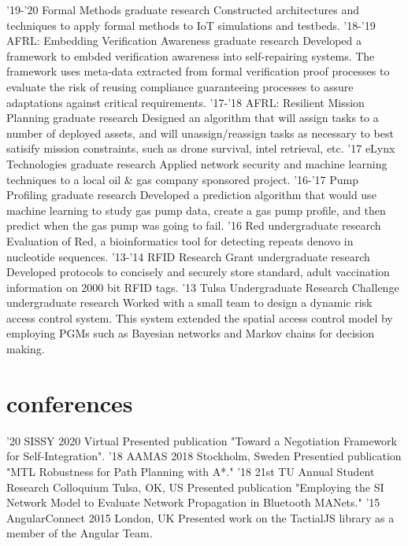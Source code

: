 \documentclass[print]{friggeri-cv}
\begin{document}
    \begin{entrylist}
      \entry
        {'19-'20}
        {Formal Methods}
        {graduate research}
        {Constructed architectures and techniques to apply formal methods to IoT simulations and testbeds.}
      \entry
        {'18-'19}
        {AFRL: Embedding Verification Awareness}
        {graduate research}
        {Developed a framework to embded verification awareness into self-repairing systems. The framework uses meta-data extracted from formal verification proof processes to evaluate the risk of reusing compliance guaranteeing processes to assure adaptations against critical requirements.}
      \entry
        {'17-'18}
        {AFRL: Resilient Mission Planning}
        {graduate research}
        {Designed an algorithm that will assign tasks to a number of deployed assets, and will unassign/reassign tasks as necessary to best satisify mission constraints, such as drone survival, intel retrieval, etc.}
      \entry
        {'17}
        {eLynx Technologies}
        {graduate research}
        {Applied network security and machine learning techniques to a local oil \& gas company sponsored project.}
      \entry
        {'16-'17}
        {Pump Profiling}
        {graduate research}
        {Developed a prediction algorithm that would use machine learning to study gas pump data, create a gas pump profile, and then predict when the gas pump was going to fail.}
      \entry
        {'16}
        {Red}
        {undergraduate research}
        {Evaluation of Red, a bioinformatics tool for detecting repeats denovo in nucleotide sequences.}
      \entry
        {'13-'14}
        {RFID Research Grant}
        {undergraduate research}
        {Developed protocols to concisely and securely store standard, adult vaccination information on 2000 bit RFID tags.}
      \entry
        {'13}
        {Tulsa Undergraduate Research Challenge}
        {undergraduate research}
        {Worked with a small team to design a dynamic risk access control system. This system extended the spatial access control model by employing PGMs such as Bayesian networks and Markov chains for decision making.}
    \end{entrylist}

  \section{conferences}

    \begin{entrylist}
      \entry
        {'20}
        {SISSY 2020}
        {Virtual}
        {Presented publication "Toward a Negotiation Framework for Self-Integration".}
      \entry
        {'18}
        {AAMAS 2018}
        {Stockholm, Sweden}
        {Presentied publication "MTL Robustness for Path Planning with A*."}
      \entry
        {'18}
        {21st TU Annual Student Research Colloquium}
        {Tulsa, OK, US}
        {Presented publication "Employing the SI Network Model to Evaluate Network Propagation in Bluetooth MANets."}
      \entry
        {'15}
        {AngularConnect 2015}
        {London, UK}
        {Presented work on the TactialJS library as a member of the Angular Team.}
    \end{entrylist}
\end{document}
